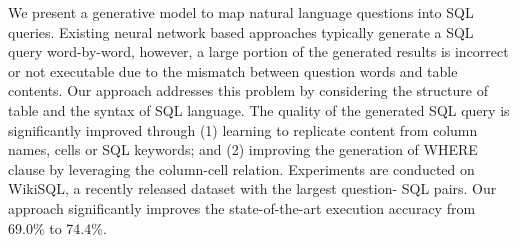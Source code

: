 We present a generative model to map natural language questions into SQL queries. Existing neural network based approaches typically generate a SQL query word-by-word, however, a large portion of the generated results is incorrect or not executable due to the mismatch between question words and table contents. Our approach addresses this problem by considering the structure of table and the syntax of SQL language. The quality of the generated SQL query is significantly improved through (1) learning to replicate content from column names, cells or SQL keywords; and (2) improving the generation of WHERE clause by leveraging the column-cell relation. Experiments are conducted on WikiSQL, a recently released dataset with the largest question- SQL pairs. Our approach significantly improves the state-of-the-art execution accuracy from 69.0\% to 74.4\%.
